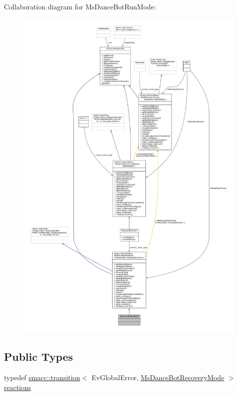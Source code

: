 Collaboration diagram for Ms\+Dance\+Bot\+Run\+Mode\+:
\nopagebreak
\begin{figure}[H]
\begin{center}
\leavevmode
\includegraphics[width=350pt]{classMsDanceBotRunMode__coll__graph}
\end{center}
\end{figure}
\subsection*{Public Types}
\begin{DoxyCompactItemize}
\item 
typedef \hyperlink{classsmacc_1_1transition}{smacc\+::transition}$<$ Ev\+Global\+Error, \hyperlink{classMsDanceBotRecoveryMode}{Ms\+Dance\+Bot\+Recovery\+Mode} $>$ \hyperlink{classMsDanceBotRunMode_af334e83af3357221ff972b9af50cad77}{reactions}
\end{DoxyCompactItemize}
